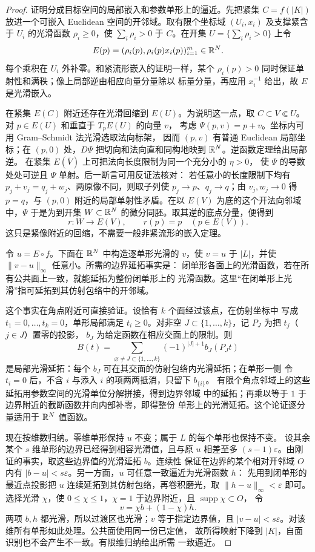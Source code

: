 \begin{proof}
证明分成目标空间的局部嵌入和参数单形上的逼近。先把紧集
$C=f(|K|)$ 放进一个可嵌入 Euclidean 空间的开邻域。取有限个坐标域
$(U_i,x_i)$ 及支撑紧含于 $U_i$ 的光滑函数 $\rho_i\geq0$，使
$\sum_i\rho_i>0$ 于 $C$。在开集 $U=\{\sum_i\rho_i>0\}$ 上令
\[
 E(p)=(\rho_i(p),\rho_i(p)x_i(p))_{i=1}^m\in\mathbb{R}^N.
\]
每个乘积在 $U_i$ 外补零。和紧流形嵌入的证明一样，某个
$\rho_i(p)>0$ 同时保证单射性和满秩；像上局部逆由相应向量分量除以
标量分量，再应用 $x_i^{-1}$ 给出，故 $E$ 是光滑嵌入。

在紧集 $E(C)$ 附近还存在光滑回缩到 $E(U)$。为说明这一点，取
$C\subset V\Subset U$。对 $p\in E(U)$ 和垂直于 $T_pE(U)$ 的向量 $v$，
考虑 $\Psi(p,v)=p+v$。坐标内可用 Gram--Schmidt 法光滑选取法向标架，
因而 $(p,v)$ 有普通 Euclidean 局部坐标；在 $(p,0)$ 处，$D\Psi$
把切向和法向直和同构地映到 $\mathbb{R}^N$。逆函数定理给出局部逆。
在紧集 $E(\overline V)$ 上可把法向长度限制为同一个充分小的 $\eta>0$，
使 $\Psi$ 的导数处处可逆且 $\Psi$ 单射。后一断言可用反证法核对：
若任意小的长度限制下均有 $p_j+v_j=q_j+w_j$、两原像不同，则取子列使
$p_j\to p$、$q_j\to q$；由 $v_j,w_j\to0$ 得 $p=q$，与 $(p,0)$
附近的局部单射性矛盾。在以 $E(V)$ 为底的这个开法向邻域中，$\Psi$
于是为到开集 $W\subset\mathbb{R}^N$ 的微分同胚。取其逆的底点分量，便得到
\[
 r:W\longrightarrow E(V),\qquad r(p)=p\quad(p\in E(V)).
\]
这只是紧像附近的回缩，不需要一般非紧流形的嵌入定理。

令 $u=E\circ f$。下面在 $\mathbb{R}^N$ 中构造逐单形光滑的 $v$，使
$v=u$ 于 $|L|$，并使 $\|v-u\|_\infty$ 任意小。所需的边界延拓事实是：
闭单形各面上的光滑函数，若在所有公共面上一致，就能延拓为整份闭单形上的
光滑函数。这里“在闭单形上光滑”指可延拓到其仿射包络中的开邻域。

这个事实在角点附近可直接验证。设恰有 $k$ 个面经过该点，在仿射坐标中
写成 $t_1=0,\ldots,t_k=0$，单形局部满足 $t_i\geq0$。对非空
$J\subset\{1,\ldots,k\}$，记 $P_J$ 为把 $t_j$（$j\in J$）置零的投影，
$b_J$ 为给定函数在相应交面上的限制。则
\[
 B(t)=\sum_{\varnothing\ne J\subset\{1,\ldots,k\}}
          (-1)^{|J|+1}b_J(P_Jt)
\]
是局部光滑延拓：每个 $b_J$ 可在其交面的仿射包络内光滑延拓；在单形一侧
令 $t_i=0$ 后，不含 $i$ 与添入 $i$ 的项两两抵消，只留下 $b_{\{i\}}$。
有限个角点邻域上的这些延拓用参数空间的光滑单位分解拼接，得到边界邻域
中的延拓；再乘以等于 $1$ 于边界附近的截断函数并向内部补零，即得整份
单形上的光滑延拓。这个论证逐分量适用于 $\mathbb{R}^N$ 值函数。

现在按维数归纳。零维单形保持 $u$ 不变；属于 $L$ 的每个单形也保持不变。
设其余某个 $s$ 维单形的边界已经得到相容光滑值，且与原 $u$ 相差至多
$(s-1)\varepsilon$。由刚证的事实，取这些边界值的光滑延拓 $b$。连续性
保证在边界的某个相对开邻域 $O$ 内有
$|b-u|<s\varepsilon$。另一方面，$u$ 可任意一致逼近为光滑函数 $h$：
先用到闭单形的最近点投影把 $u$ 连续延拓到其仿射包络，再卷积磨光，取
$\|h-u\|_\infty<\varepsilon$ 即可。选择光滑 $\chi$，使
$0\leq\chi\leq1$，$\chi=1$ 于边界附近，且 $\operatorname{supp}\chi\subset O$，
令
\[
 v=\chi b+(1-\chi)h.
\]
两项 $b,h$ 都光滑，所以过渡区也光滑；$v$ 等于指定边界值，且
$|v-u|<s\varepsilon$。对该维所有单形如此处理。公共面使用同一份已定值，
故所得映射下降到 $|K|$，自面识别也不会产生不一致。有限维归纳给出所需
一致逼近。


\end{proof}
